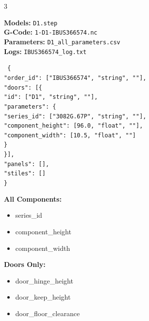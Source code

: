 \documentclass[10pt,landscape]{article}
\begin{document}
\begin{multicols}{3}
\vspace{0.2cm}

\begin{tcolorbox}[colback=yellow!10,colframe=orange!70!black,title=\textbf{File Naming}]
\textbf{Models:} \texttt{D1.step}\\
\textbf{G-Code:} \texttt{1-D1-IBUS366574.nc}\\
\textbf{Parameters:} \texttt{D1\_all\_parameters.csv}\\
\textbf{Logs:} \texttt{IBUS366574\_log.txt}
\end{tcolorbox}

\begin{tcolorbox}[colback=purple!10,colframe=purple!70!black,title=\textbf{JSON Format}]
\texttt{\tiny
\{\\
\quad "order\_id": ["IBUS366574", "string", ""],\\
\quad "doors": [\{\\
\quad\quad "id": ["D1", "string", ""],\\
\quad\quad "parameters": \{\\
\quad\quad\quad "series\_id": ["3082G.67P", "string", ""],\\
\quad\quad\quad "component\_height": [96.0, "float", ""],\\
\quad\quad\quad "component\_width": [10.5, "float", ""]\\
\quad\quad \}\\
\quad \}],\\
\quad "panels": [],\\
\quad "stiles": []\\
\}
}
\end{tcolorbox}

\vspace{0.2cm}

\begin{tcolorbox}[colback=blue!10,colframe=blue!70!black,title=\textbf{Required Parameters}]
\textbf{All Components:}
\begin{itemize}[noitemsep,leftmargin=*]
    \item series\_id
    \item component\_height
    \item component\_width
\end{itemize}

\textbf{Doors Only:}
\begin{itemize}[noitemsep,leftmargin=*]
    \item door\_hinge\_height
    \item door\_keep\_height
    \item door\_floor\_clearance
\end{itemize}


\end{tcolorbox}
\end{multicols}
\end{document}
